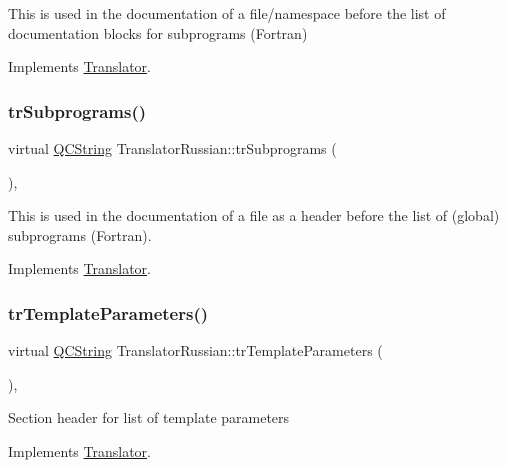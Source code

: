 This is used in the documentation of a file/namespace before the list of documentation blocks for subprograms (Fortran) 

Implements \mbox{\hyperlink{class_translator}{Translator}}.

\mbox{\label{class_translator_russian_a60a2f6c4837046b2af0dc984f436c723}} 
\subsubsection{\texorpdfstring{trSubprograms()}{trSubprograms()}}
{\footnotesize\ttfamily virtual \mbox{\hyperlink{class_q_c_string}{Q\+C\+String}} Translator\+Russian\+::tr\+Subprograms (\begin{DoxyParamCaption}{ }\end{DoxyParamCaption})\hspace{0.3cm}{\ttfamily [inline]}, {\ttfamily [virtual]}}

This is used in the documentation of a file as a header before the list of (global) subprograms (Fortran). 

Implements \mbox{\hyperlink{class_translator}{Translator}}.

\mbox{\label{class_translator_russian_aa6ba085eda850e649d1c361aa5da1013}} 
\subsubsection{\texorpdfstring{trTemplateParameters()}{trTemplateParameters()}}
{\footnotesize\ttfamily virtual \mbox{\hyperlink{class_q_c_string}{Q\+C\+String}} Translator\+Russian\+::tr\+Template\+Parameters (\begin{DoxyParamCaption}{ }\end{DoxyParamCaption})\hspace{0.3cm}{\ttfamily [inline]}, {\ttfamily [virtual]}}

Section header for list of template parameters 

Implements \mbox{\hyperlink{class_translator}{Translator}}.

\mbox{\label{class_translator_russian_a72aba7b37f62a54f1a4a752e34b7661d}} 
